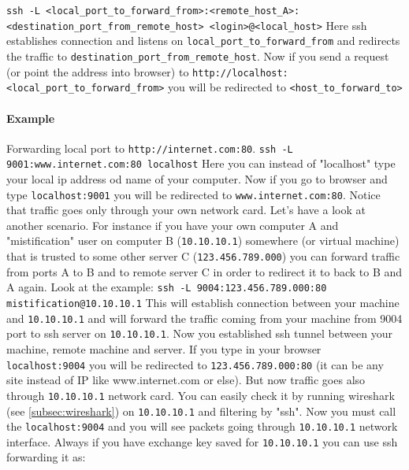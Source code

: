 \documentclass{article}[12pt]
\newcommand{\q}[1]{\texttt{#1}}
\begin{document}
\texttt{ssh -L <local\_port\_to\_forward\_from>:<remote\_host\_A>:<destination\_port\_from\_remote\_host> <login>@<local\_host>} \newline\newline
Here ssh establishes connection and listens on \q{local\_port\_to\_forward\_from} and redirects the traffic to \q{destination\_port\_from\_remote\_host}.
Now if you send a request (or point the address into browser) to \q{http://localhost:<local\_port\_to\_forward\_from>} you will be redirected to \q{<host\_to\_forward\_to>}

\paragraph{Example} Forwarding local port to \q{http://internet.com:80}. \newline \newline
\texttt{ssh -L 9001:www.internet.com:80 localhost} \newline \newline
Here you can instead of "localhost" type your local ip address od name of your computer.
Now if you go to browser and type \q{localhost:9001} you will be redirected to \q{www.internet.com:80}.
Notice that traffic goes only through your own network card.
\newline
\newline
Let's have a look at another scenario.
For instance if you have your own computer A and "mistification" user on  computer B (\q{10.10.10.1}) somewhere (or virtual machine) that is trusted to some other server C (\q{123.456.789.000}) you can forward traffic from ports A to B and to remote server C in order to redirect it to back to B and A again.
Look at the example: \newline \newline
\texttt{ssh -L 9004:123.456.789.000:80 mistification@10.10.10.1} \newline \newline
This will establish connection between your machine and \q{10.10.10.1} and will forward the traffic coming from your machine from 9004 port to ssh server on \q{10.10.10.1}.
Now you established ssh tunnel between your machine, remote machine and server.
If you type in your browser \q{localhost:9004} you will be redirected to \q{123.456.789.000:80} (it can be any site instead of IP like www.internet.com or else).
But now traffic goes also through \q{10.10.10.1} network card.
You can easily check it by running wireshark (see \ref{subsec:wireshark}) on \q{10.10.10.1} and filtering by "ssh".
Now you must call the \q{localhost:9004} and you will see packets going through \q{10.10.10.1} network interface.
Always if you have exchange key saved for \q{10.10.10.1} you can use ssh forwarding it as:\newline \newline
\end{document}
